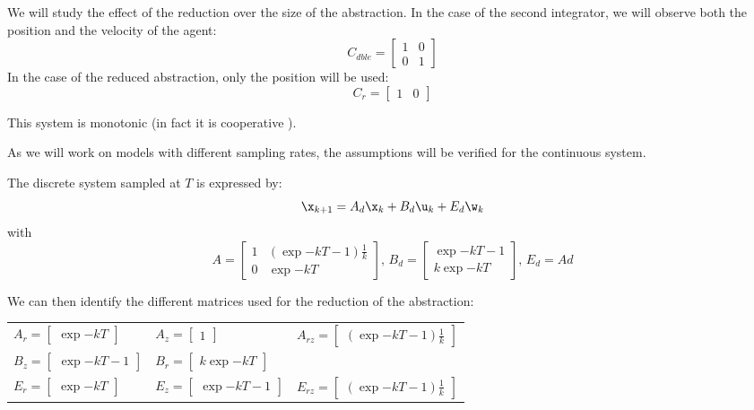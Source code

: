 We will study the effect of the reduction over the size of the abstraction. In the case of the second integrator, we will observe both the position and the velocity of the agent:
\begin{equation}
C_{dble} = \begin{bmatrix}
1 & 0\\
0 & 1
\end{bmatrix}
\end{equation}
In the case of the reduced abstraction, only the position will be used:
\begin{equation}
 C_r = \begin{bmatrix}
 1 & 0
 \end{bmatrix}
\end{equation}

This system is monotonic (in fact it is cooperative ).

As we will work on models with different sampling rates, the assumptions will be verified for the continuous system.

\newcommand{\dt}{T}
The discrete system sampled at $\dt$ is expressed by:
\begin{equation}
\x_{k+1} = A_d \x_k + B_d \u_k + E_d \w_k
\end{equation}
with
\begin{equation*} \label{eqn:sec_int_disc}
A = \begin{bmatrix}
1 & (\exp{-k \dt} - 1)\frac{1}{k}\\ 
0 & \exp{-k\dt}
\end{bmatrix}
\textrm{, }
B_d = \begin{bmatrix}
\exp{-k \dt} - 1 \\ 
k \exp{-k \dt}
\end{bmatrix}
\textrm{, }
E_d = Ad
\end{equation*}

We can then identify the different matrices used for the reduction of the abstraction:\\
\begin{tabular}{lll}
$A_r =  \begin{bmatrix} \exp{-k\dt} \end{bmatrix} $
&
$A_z =  \begin{bmatrix} 1 \end{bmatrix} $
&
$A_{rz} =  \begin{bmatrix} (\exp{-k \dt} - 1)\frac{1}{k} \end{bmatrix}$
\\
$B_z =  \begin{bmatrix} \exp{-k \dt} - 1 \end{bmatrix} $
&
$B_r =  \begin{bmatrix} k \exp{-k\dt} \end{bmatrix} $
&
\\
$E_r =  \begin{bmatrix} \exp{-k\dt} \end{bmatrix} $
&
$E_z =  \begin{bmatrix} \exp{-k \dt} - 1 \end{bmatrix} $
&
$E_{rz} =  \begin{bmatrix} (\exp{-k \dt} - 1)\frac{1}{k} \end{bmatrix}$
\end{tabular}

